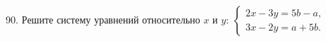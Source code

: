 90. Решите систему уравнений относительно $x$ и $y:\ \begin{cases}2x-3y=5b-a,\\ 3x-2y=a+5b. \end{cases}$\\
